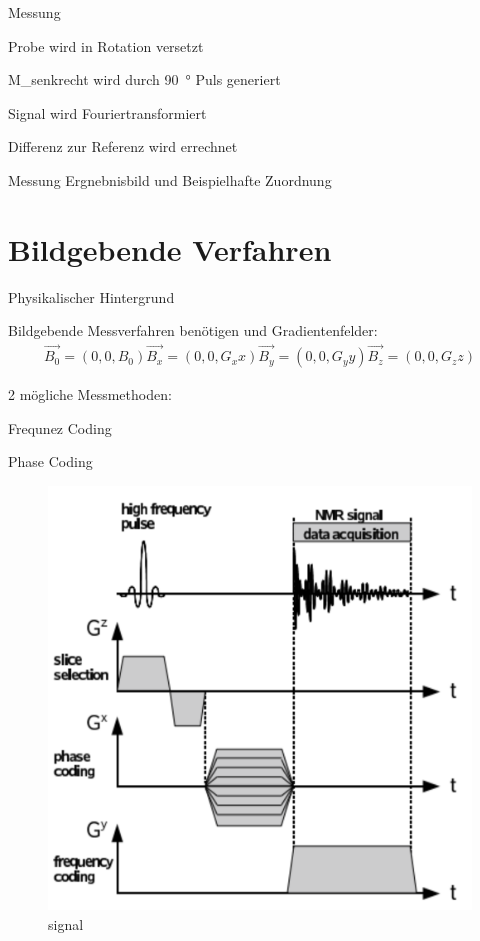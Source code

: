 \begin{frame}{Messung}
	\item Probe wird in Rotation versetzt
	\item M_{senkrecht} wird durch \SI{90}{\degree} Puls generiert
	\item Signal wird Fouriertransformiert
	\item Differenz zur Referenz wird errechnet
\end{frame}

\begin{frame}{Messung}
Ergnebnisbild und Beispielhafte Zuordnung
\end{frame}


\section{Bildgebende Verfahren} %
\begin{frame}{Physikalischer Hintergrund}
	\item Bildgebende Messverfahren benötigen  und Gradientenfelder:
	\begin{align*}
	\vec{B_{0}}=(0,0,B_{0})
	\vec{B_{x}}=(0,0,G_{x}x)
	\vec{B_{y}}=(0,0,G_{y}y)
	\vec{B_{z}}=(0,0,G_{z}z)
	\end{align*}
	\item 2 mögliche Messmethoden:
		\item Frequnez Coding
		\item Phase Coding
\begin{figure}
\centering
\includegraphics[scale=.1]{images//signal.png}
\caption{signal}
\end{figure}
\end{frame}

